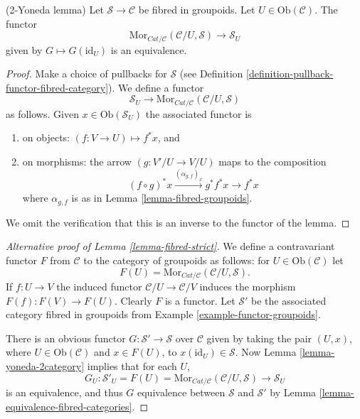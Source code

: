 \begin{lemma}
\label{lemma-yoneda-2category}
(2-Yoneda lemma)
Let $\mathcal{S}\to \mathcal{C}$ be fibred in groupoids.
Let $U \in \text{Ob}(\mathcal{C})$.
The functor
$$
\text{Mor}_{\textit{Cat}/\mathcal{C}}(\mathcal{C}/U, \mathcal{S})
\longrightarrow
\mathcal{S}_U
$$
given by $G \mapsto G(\text{id}_U)$ is an equivalence.
\end{lemma}

\begin{proof}
Make a choice of pullbacks for $\mathcal{S}$
(see Definition \ref{definition-pullback-functor-fibred-category}).
We define a functor
$$
\mathcal{S}_U
\longrightarrow
\text{Mor}_{\textit{Cat}/\mathcal{C}}(\mathcal{C}/U, \mathcal{S})
$$
as follows. Given
$x \in \text{Ob}(\mathcal{S}_U)$
the associated functor is
\begin{enumerate}
\item on objects: $(f : V \to U) \mapsto f^*x$, and
\item on morphisms: the arrow $(g : V'/U \to V/U)$ maps to
the composition
$$
(f \circ g)^*x \xrightarrow{(\alpha_{g, f})_x} g^*f^*x \rightarrow f^*x
$$
where $\alpha_{g, f}$ is as in Lemma \ref{lemma-fibred-groupoids}.
\end{enumerate}
We omit the verification that this is an inverse to the functor
of the lemma.
\end{proof}

\begin{proof}[Alternative proof of Lemma \ref{lemma-fibred-strict}]
We define a contravariant functor $F$ from $\mathcal{C}$ to the
category of groupoids as follows: for $U\in \text{Ob}(\mathcal{C})$
let
$$
F(U) = \text{Mor}_{\textit{Cat}/\mathcal{C}}(\mathcal{C}/U, \mathcal{S}).
$$
If $f : U \to V$ the induced functor $\mathcal{C}/U \to \mathcal{C}/V$
induces the morphism $F(f) : F(V) \to F(U)$. Clearly $F$ is a functor.
Let $\mathcal{S}'$ be the associated category fibred in groupoids from
Example \ref{example-functor-groupoids}.

\medskip\noindent
There is an obvious functor $G : \mathcal{S}' \to \mathcal{S}$
over $\mathcal{C}$ given by taking the pair $(U, x)$, where
$U \in \text{Ob}(\mathcal{C})$ and $x \in F(U)$, to
$x(\text{id}_U) \in \mathcal{S}$.  Now
Lemma \ref{lemma-yoneda-2category}
implies that for each $U$,
$$
G_U : \mathcal{S}'_U = F(U)=
\text{Mor}_{\textit{Cat}/\mathcal{C}}(\mathcal{C}/U, \mathcal{S})
\to
\mathcal{S}_U
$$
is an equivalence, and thus $G$ equivalence between $\mathcal{S}$ and
$\mathcal{S}'$ by Lemma \ref{lemma-equivalence-fibred-categories}.
\end{proof}

